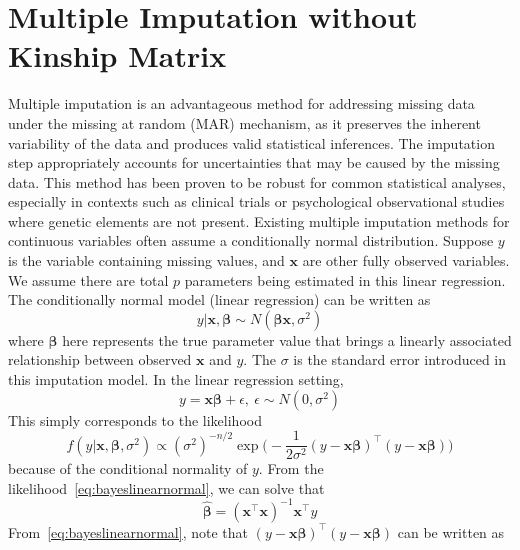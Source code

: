 \section{Multiple Imputation without Kinship Matrix}
Multiple imputation is an advantageous method for addressing missing data under the missing at random (MAR) mechanism, as it preserves the inherent variability of the data and produces valid statistical inferences. 
The imputation step appropriately accounts for uncertainties that may be caused by the missing data. 
This method has been proven to be robust for common statistical analyses, especially in contexts such as clinical trials or psychological observational studies where genetic elements are not present. 
Existing multiple imputation methods for continuous variables often assume a conditionally normal distribution. 
Suppose $y$ is the variable containing missing values, and $\mathbf{x}$ are other fully observed variables.
We assume there are total $p$ parameters being estimated in this linear regression. 
The conditionally normal model (linear regression) can be written as 
\begin{equation} 
    y|\mathbf{x},\boldsymbol{\beta}\sim N(\boldsymbol{\beta}\mathbf{x}, \sigma^2)
\end{equation}
where $\boldsymbol{\beta}$ here represents the true parameter value that brings a linearly associated relationship between observed $\mathbf{x}$ and $y$.
The $\sigma$ is the standard error introduced in this imputation model. 
In the linear regression setting, 
\begin{equation} 
    y=\mathbf{x}\boldsymbol{\beta}+\epsilon,~ \epsilon\sim N(0, \sigma^2)
\end{equation}
This simply corresponds to the likelihood 
\begin{equation}\label{eq:bayeslinearnormal}
    f(y|\mathbf{x}, \boldsymbol{\beta}, \sigma^2)\propto (\sigma^2)^{-n/2}\exp \Big (-\frac{1}{2\sigma^2} (y-\mathbf{x}\boldsymbol{\beta})^{\top}(y-\mathbf{x}\boldsymbol{\beta})\Big )
\end{equation}
because of the conditional normality of $y$. 
From the likelihood~\ref{eq:bayeslinearnormal}, we can solve that 
\begin{equation} 
    \hat{\boldsymbol{\beta}}=(\mathbf{x}^{\top}\mathbf{x})^{-1}\mathbf{x}^{\top}y
\end{equation}
From~\ref{eq:bayeslinearnormal}, note that $(y-\mathbf{x}\boldsymbol{\beta})^{\top}(y-\mathbf{x}\boldsymbol{\beta})$ can be written as 
